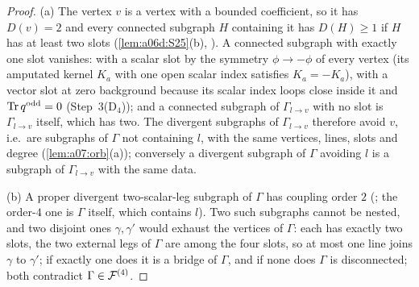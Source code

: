 \begin{proof}
(a) The vertex $v$ is a \cite[(1.7)]{Ba3} vertex with a bounded coefficient, so it has $D(v)=2$ and every connected subgraph $H$ containing it has $D(H)\ge1$ if $H$ has at least two slots (\cref{lem:a06d:S25}(b), \cite[Cor.~2.3]{Ba3}). A connected subgraph with exactly one slot vanishes: with a scalar slot by the symmetry $\phi\to-\phi$ of every vertex (its amputated kernel $K_a$ with one open scalar index satisfies $K_a=-K_a$), with a vector slot at zero background because its scalar index loops close inside it and $\operatorname{Tr} q^{\mathrm{odd}}=0$ (Step~3(D$_4$)); and a connected subgraph of $\Gamma_{l\to v}$ with no slot is $\Gamma_{l\to v}$ itself, which has two. The divergent subgraphs of $\Gamma_{l\to v}$ therefore avoid $v$, i.e.\ are subgraphs of $\Gamma$ not containing $l$, with the same vertices, lines, slots and degree (\cref{lem:a07:orb}(a)); conversely a divergent subgraph of $\Gamma$ avoiding $l$ is a subgraph of $\Gamma_{l\to v}$ with the same data.

(b) A proper divergent two-scalar-leg subgraph of $\Gamma$ has coupling order $2$ (\cite[(1.23)]{Ba3}; the order-$4$ one is $\Gamma$ itself, which contains $l$). Two such subgraphs cannot be nested, and two disjoint ones $\gamma,\gamma'$ would exhaust the vertices of $\Gamma$: each has exactly two slots, the two external legs of $\Gamma$ are among the four slots, so at most one line joins $\gamma$ to $\gamma'$; if exactly one does it is a bridge of $\Gamma$, and if none does $\Gamma$ is disconnected; both contradict $\Gamma\in\mathcal F^{(4)}$.


\end{proof}
